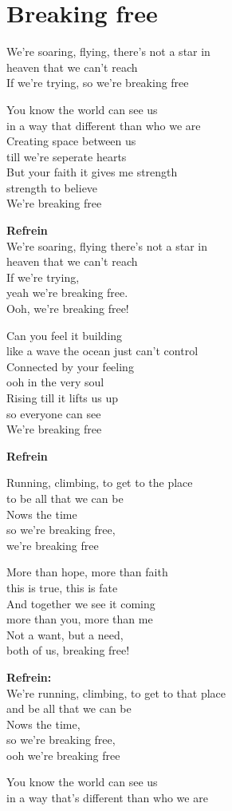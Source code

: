 \section{Breaking free}
We're soaring, flying, there's not a star in\\
heaven that we can’t reach\\
If we're trying, so we're breaking free

You know the world can see us\\
in a way that different than who we are\\
Creating space between us\\
till we're seperate hearts\\
But your faith it gives me strength\\
strength to believe\\
We're breaking free

\textbf{Refrein}\\
We're soaring, flying
there's not a star in\\
heaven that we can’t reach\\
If we're trying,\\
yeah we're breaking free.\\
Ooh, we're breaking free!

Can you feel it building\\
like a wave the ocean just can’t control\\
Connected by your feeling\\
ooh in the very soul\\
Rising till it lifts us up\\
so everyone can see\\
We're breaking free

\textbf{Refrein}

Running, climbing, to get to the place\\
to be all that we can be\\
Nows the time\\
so we're breaking free,\\
we're breaking free

More than hope, more than faith\\
this is true, this is fate\\
And together we see it coming\\
more than you, more than me\\
Not a want, but a need,\\
both of us, breaking free!

\textbf{Refrein:}\\
We're running, climbing, to get to that place\\
and be all that we can be\\
Nows the time,\\
so we're breaking free,\\
ooh we're breaking free

You know the world can see us\\
in a way that's different than who we are
